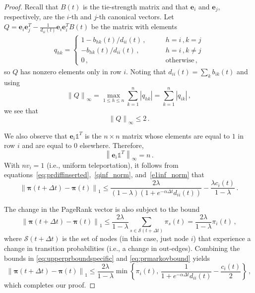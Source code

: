 \documentclass[journal,transmag]{IEEEtran}
\newcommand{\gvec}[1]{\bm{#1}}
\newcommand{\vecb}[1]{\mathbf{#1}}
\newcommand{\norm}[1]{\left\| #1 \right\|}
\newcommand{\tdt}{t+\Delta t}
\newcommand{\vpi}{\gvec{\pi}}
\begin{document}
\begin{proof}
Recall that $B(t)$ is the tie-strength matrix and that $\vecb{e}_{i}$
and $\vecb{e}_{j}$, respectively, are the $i$-th and $j$-th canonical
vectors. Let $Q = \vecb{e}_{i}\vecb{e}_{j}^T -\frac{1}{d_{ii}(t)}
\vecb{e}_{i}\vecb{e}_{i}^TB(t)$ be the matrix with elements
\begin{align}
	q_{hk} = 
\begin{cases}
  1 - b_{hk}(t)/d_{ii}(t) \,, & \qquad h = i\,, k = j \\
  - b_{hk}(t)/d_{ii}(t) \,, & \qquad h = i\,, k \neq j  \\
  0 \,, & \qquad \text{otherwise}\,,
\end{cases}
\end{align}
so $Q$ has nonzero elements only in row $i$. 
Noting that $d_{ii}(t) = \sum_{k} b_{ik}(t)$ and using
\begin{equation}
	\norm{Q}_\infty = \max_{1 \leq h \leq n} \sum_{k=1}^n |q_{hk}|
        = \sum_{k=1}^n |q_{ik}|\,,
\end{equation}
we see that
\begin{equation}
\label{qinf_norm}
	\norm{Q}_\infty \leq 2\,.
\end{equation}

We also observe that $\vecb{e}_i \mathbb{1}^T$ is the $n \times n$ matrix whose elements are equal to $1$ in row $i$ and are equal to $0$ elsewhere. 
Therefore, 
\begin{equation}
\label{e1inf_norm}
	\norm{\vecb{e}_i \mathbb{1}^T}_\infty = n\,.
\end{equation}
With $nv_i = 1$ (i.e., uniform teleportation), it follows from equations~\eqref{eq:prdiffinserted},~\eqref{qinf_norm}, and~\eqref{e1inf_norm} that
\begin{equation}
  \norm{\vpi(\tdt) - \vpi(t)}_{1} \leq
  \frac{2\lambda}{(1-\lambda)(1+e^{-\alpha \Delta t}d_{ii}(t))} -
  \frac{\lambda c_i(t)}{1-\lambda}\,.
  \label{eq:upperprboundspecific}
\end{equation}

The change in the PageRank vector is also subject to the
bound~\cite{Lee2003,Ng2001}
\begin{equation}
  \norm{\vpi(\tdt) - \vpi(t)}_1 \leq 
  \frac{2\lambda}{1-\lambda} \sum_{s \in \mathcal{S}(\tdt)}\pi_{s}(t)
  = \frac{2 \lambda }{1-\lambda}\pi_{i}(t)\,,
  \label{eq:prmarkovbound}
\end{equation}
where $\mathcal{S}(\tdt)$ is the set of nodes (in this case, just node
$i$) that experience a change in transition probabilities (i.e., a
change in out-edges). Combining the bounds in \eqref{eq:upperprboundspecific} and \eqref{eq:prmarkovbound} yields
{\tiny
\begin{equation}\label{ineq}
	  \norm{\vpi(\tdt) - \vpi(t)}_1 
  \leq \frac{2\lambda}{1-\lambda} \min 
  \left\{ \pi_{i}(t), \, 
    \frac{1}{1+e^{-\alpha \Delta t}d_{ii}(t)} - \frac{c_i(t)}{2} \right\}\,,
\end{equation}}
which completes our proof.
\end{proof}
\end{document}
